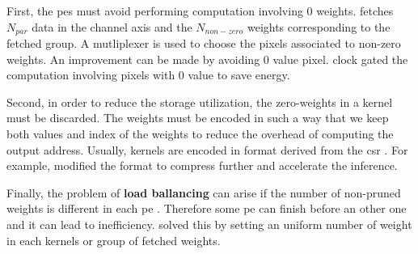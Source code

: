 First, the \acrshort{pe}s must avoid performing computation involving 0 weights. \textcite{kang_accelerator-aware_2020} fetches $N_{par}$ data in the channel axis and the $N_{non-zero}$ weights corresponding to the fetched group. A mutliplexer is used to choose the pixels associated to non-zero weights. An improvement can be made by avoiding 0 value pixel. \textcite{zhu_efficient_2020} clock gated the computation involving pixels with 0 value to save energy.

Second, in order to reduce the storage utilization, the zero-weights in a kernel must be discarded. The weights must be encoded in such a way that we keep both values and index of the weights to reduce the overhead of computing the output address.  Usually, kernels are encoded in format derived from the \acrfull{csr} \cite{mao_exploring_2017}. For example, \cite{zhu_efficient_2020} modified the format to compress further and accelerate the inference.

Finally, the problem of \textbf{load ballancing} can arise if the number of non-pruned weights is different in each \acrshort{pe} \cite{kim_zena_2018}. Therefore some \acrshort{pe} can finish before an other one and it can lead to inefficiency. \textcite{zhu_efficient_2020, kang_accelerator-aware_2020} solved this by setting an uniform number of weight in each kernels or group of fetched weights.
